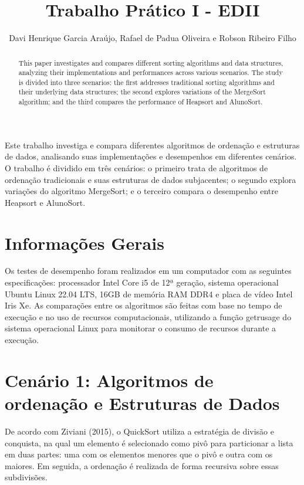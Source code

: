 \documentclass{SBCbookchapter}
\author{Davi Henrique Garcia Araújo, Rafael de Padua Oliveira e Robson Ribeiro Filho}
\title{Trabalho Prático I - EDII}
\begin{document}
\maketitle

\begin{abstract}
This paper investigates and compares different sorting algorithms and data structures, analyzing their implementations and performances across various scenarios. The study is divided into three scenarios: the first addresses traditional sorting algorithms and their underlying data structures; the second explores variations of the MergeSort algorithm; and the third compares the performance of Heapsort and AlunoSort.
\end{abstract}

\begin{resumo}
Este trabalho investiga e compara diferentes algoritmos de ordenação e estruturas de dados, analisando suas implementações e desempenhos em diferentes cenários. O trabalho é dividido em três cenários: o primeiro trata de algoritmos de ordenação tradicionais e suas estruturas de dados subjacentes; o segundo explora variações do algoritmo MergeSort; e o terceiro compara o desempenho entre Heapsort e AlunoSort.
\begin{otherlanguage}{brazilian}

\end{otherlanguage}
\end{resumo}

\section{Informações Gerais}
Os testes de desempenho foram realizados em um computador com as seguintes especificações: processador Intel Core i5 de 12ª geração, sistema operacional Ubuntu Linux 22.04 LTS, 16GB de memória RAM DDR4 e placa de vídeo Intel Iris Xe. As comparações entre os algoritmos são feitas com base no tempo de execução e no uso de recursos computacionais, utilizando a função getrusage do sistema operacional Linux para monitorar o consumo de recursos durante a execução.
\section{Cenário 1: Algoritmos de ordenação e Estruturas de Dados}
De acordo com Ziviani (2015), o QuickSort utiliza a estratégia de divisão e conquista, na qual um elemento é selecionado como pivô para particionar a lista em duas partes: uma com os elementos menores que o pivô e outra com os maiores. Em seguida, a ordenação é realizada de forma recursiva sobre essas subdivisões.
\end{document}
